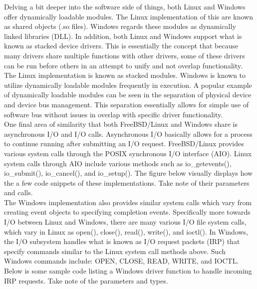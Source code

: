 \documentclass[letterpaper,10pt,titlepage]{article}
\begin{document}
Delving a bit deeper into the software side of things, both Linux and Windows offer dynamically loadable modules.  The Linux implementation of this are known as shared objects (.so files).  Windows regards these modules as dynamically linked libraries (DLL).  In addition, both Linux and Windows support what is known as stacked device drivers.  This is essentially the concept that because many drivers share multiple functions with other drivers, some of these drivers can be run before others in an attempt to unify and not overlap functionality.\cite{stackedDeviceDrivers}  The Linux implementation is known as stacked modules.  Windows is known to utilize dynamically loadable modules frequently in execution.  A popular example of dynamically loadable modules can be seen in the separation of physical device and device bus management.\cite{mwi8} This separation essentially allows for simple use of software bus without issues in overlap with specific driver functionality.\\

One final area of similarity that both FreeBSD/Linux and Windows share is asynchronous I/O and I/O calls.  Asynchronous I/O basically allows for a process to continue running after submitting an I/O request.  FreeBSD/Linux provides various system calls through the POSIX synchronous I/O interface (AIO).  Linux system calls through AIO include various methods such as io\_getevents(),  io\_submit(), io\_cancel(), and io\_setup().  The figure below visually displays how the a few code snippets of these implementations. \cite{linuxAIO}  Take note of their parameters and calls.\\



The Windows implementation also provides similar system calls which vary from creating event objects to specifying completion events.  Specifically more towards I/O between Linux and Windows, there are many various I/O file system calls, which vary in Linux as open(), close(), read(), write(), and ioctl().\cite{lkd14}  In Windows, the I/O subsystem handles what is known as I/O request packets (IRP) that specify commands similar to the Linux system call methods above.  Such Windows commands include: OPEN, CLOSE, READ, WRITE, and IOCTL.\cite{mwi8}  Below is some sample code listing a Windows driver function to handle incoming IRP requests. \cite{windowsIRP} Take note of the parameters and types.\\
\end{document}
